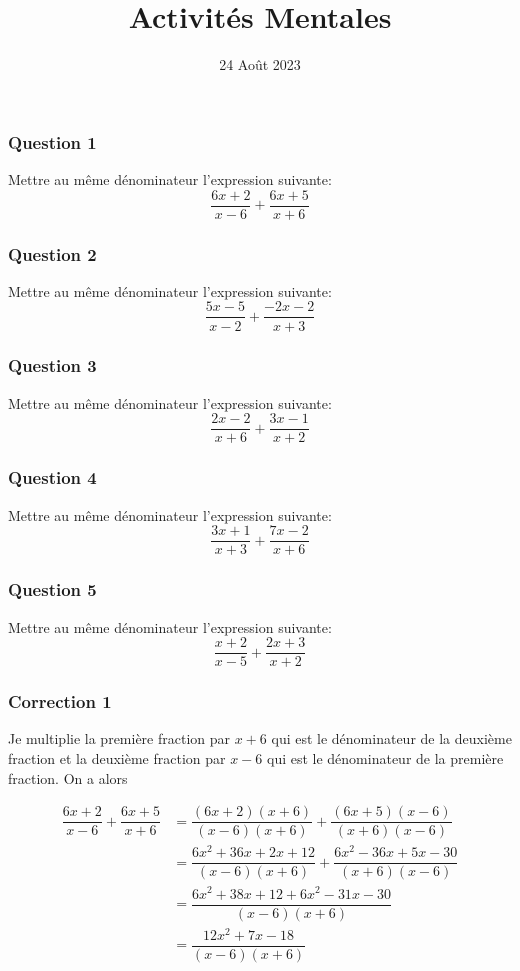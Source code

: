\documentclass[15pt, mathserif]{beamer}
\title{Activités Mentales}
\date{24 Août 2023}
\begin{document}
\begin{frame}
    \titlepage
\end{frame}

\begin{frame} 
	\frametitle{Question 1}
Mettre au même dénominateur l'expression suivante: \[\dfrac{6x+2}{x-6} + \dfrac{6x+5}{x+6}\]\end{frame}


\begin{frame} 
	\frametitle{Question 2}
Mettre au même dénominateur l'expression suivante: \[\dfrac{5x-5}{x-2} + \dfrac{-2x-2}{x+3}\]\end{frame}


\begin{frame} 
	\frametitle{Question 3}
Mettre au même dénominateur l'expression suivante: \[\dfrac{2x-2}{x+6} + \dfrac{3x-1}{x+2}\]\end{frame}


\begin{frame} 
	\frametitle{Question 4}
Mettre au même dénominateur l'expression suivante: \[\dfrac{3x+1}{x+3} + \dfrac{7x-2}{x+6}\]\end{frame}


\begin{frame} 
	\frametitle{Question 5}
Mettre au même dénominateur l'expression suivante: \[\dfrac{x+2}{x-5} + \dfrac{2x+3}{x+2}\]\end{frame}


\begin{frame}
\vspace{-10mm}
	\frametitle{Correction 1}


\bigskip 

Je multiplie la première fraction par $x+6$ qui est le dénominateur de la deuxième fraction et la deuxième fraction par $x-6$ qui est le dénominateur de la première fraction. On a alors 

 \begin{align*} \dfrac{6x+2}{x-6} + \dfrac{6x+5}{x+6} &= \dfrac{(6x+2)(x+6)}{(x-6)(x+6)} + \dfrac{(6x+5)(x-6)}{(x+6)(x-6)}\\ &= \dfrac{6x^2+36x+2x+12}{(x-6)(x+6)}+ \dfrac{6x^2-36x+5x-30}{(x+6)(x-6)} \\
	&=\dfrac{6x^2+38x+12+6x^2-31x-30}{(x-6)(x+6)}\\
	&=\dfrac{12x^2+7x-18}{(x-6)(x+6)}
\end{align*}\end{frame}
\end{document}
